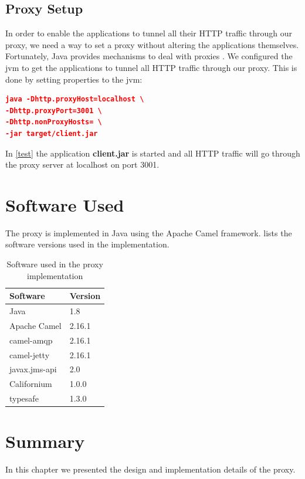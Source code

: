 


\subsection{Proxy Setup}

In order to enable the applications to tunnel all their HTTP traffic through our
proxy, we need a way to set a proxy without altering the applications
themselves. Fortunately, Java provides mechanisms to deal with proxies
\cite{oracle-proxy}. We configured the \gls{jvm} to get the applications to
tunnel all HTTP traffic through our proxy. This is done by setting properties to
the \gls{jvm}:


\begin{lstlisting}[frame=single, language=json, caption="Setting a proxy on the \gls{jvm}", label=test]
java -Dhttp.proxyHost=localhost \
-Dhttp.proxyPort=3001 \
-Dhttp.nonProxyHosts= \
-jar target/client.jar
\end{lstlisting}

In \cref{test} the application \textbf{client.jar} is started and all HTTP
traffic will go through the proxy server at localhost on port 3001.


\section{Software Used}

The proxy is implemented in Java using the Apache Camel framework.
 lists the software versions used in the
implementation.

\begin{table}[h]
\begin{tabular}{|l|l|}
    \hline
\textbf{Software} & \textbf{Version} \\ \hline
Java            & 1.8           \\ \hline
Apache Camel     & 2.16.1           \\ \hline
camel-amqp      & 2.16.1            \\ \hline
camel-jetty      & 2.16.1            \\ \hline
javax.jms-api      & 2.0            \\ \hline
Californium      & 1.0.0            \\ \hline
typesafe      & 1.3.0            \\ \hline
\end{tabular}
\caption{Software used in the proxy implementation}
\label{table:implementation-versions}
\end{table}

\section{Summary}

In this chapter we presented the design and implementation details of the proxy.
